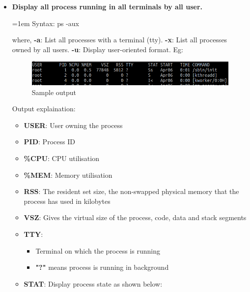 \begin{flushleft}
\begin{itemize}
		
		\begin{itemize}
			\item \textbf{Display all process running in all terminals by all user.}
			\bigskip
			\begin{tcolorbox}[breakable,notitle,boxrule=-0pt,colback=pink,colframe=pink]
				\color{black}
				\font=1em
				Syntax: ps -aux
				\font=4pt
			\end{tcolorbox}	
			where,
			\newline
			\textbf{-a}: List all processes with a terminal (tty).
			\newline
			\textbf{-x}: List all processes owned by all users.
			\newline
			\textbf{-u}: Display user-oriented format.
			\newline
			Eg: 
			\begin{figure}[h!]
				\centering
				\includegraphics[scale=.35]{content/chapter12/images/ps.png}
				\caption{Sample output}
				\label{fig:process234}
			\end{figure}
			\newline
			Output explaination:
			\begin{itemize}
				\item \textbf{USER}: User owning the process
				\item \textbf{PID}: Process ID
				\item \textbf{\%CPU}: CPU utilisation
				\item \textbf{\%MEM}: Memory utilisation
				\item \textbf{RSS}: The resident set size, the non-swapped physical memory that the process has used in kilobytes
				\item \textbf{VSZ}: Gives the virtual size of the process, code, data and stack segments
				\item \textbf{TTY}: 
				\begin{itemize}
					\item Terminal on which the process is running
					\item \textbf{"?"} means process is running in background
				\end{itemize}
				\item \textbf{STAT}: Display process state as shown below:
					\newline

\end{itemize}
\end{itemize}
\end{itemize}
\end{flushleft}
